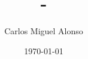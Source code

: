 \documentclass[12pt, spanish]{beamer}
\title{-}
\author[CMA]{Carlos Miguel Alonso}
\institute{ACM UPM}
\date{\today}
\begin{document}
\begin{frame}
   \thispagestyle{empty}
   \titlepage
\end{frame}

\begin{frame}
    \centering
    
\end{frame}






%
%
%
%
%
\end{document}
